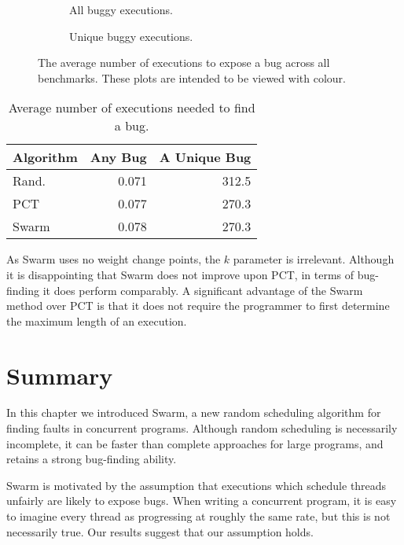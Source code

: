 \begin{figure}
  \centering
  \begin{subfigure}{0.49\textwidth}
    \centering
    \resizebox{\textwidth}{!}{}
    \caption{All buggy executions.}\label{fig:freqbugs-total}
  \end{subfigure}
  \begin{subfigure}{0.49\textwidth}
    \centering
    \resizebox{\textwidth}{!}{}
    \caption{Unique buggy executions.}\label{fig:freqbugs-unique}
  \end{subfigure}
  \caption[Plot of average number of executions needed to expose a bug.]{The average number of executions to expose a bug across all benchmarks.  These plots are intended to be viewed with colour.}\label{fig:freqbugs}
\end{figure}

\begin{table}
  \centering
  \begin{tabular}{lrr} \toprule
    Algorithm & Any Bug & A Unique Bug \\ \midrule
    Rand. & 0.071 & 312.5 \\
    PCT   & 0.077 & 270.3 \\
    Swarm & 0.078 & 270.3 \\ \bottomrule
  \end{tabular}
  \caption{Average number of executions needed to find a bug.}\label{tbl:freqs}
\end{table}

As Swarm uses no weight change points, the $k$ parameter is
irrelevant.  Although it is disappointing that Swarm does not improve
upon PCT, in terms of bug-finding it does perform comparably.  A
significant advantage of the Swarm method over PCT is that it does not
require the programmer to first determine the maximum length of an
execution.

\section{Summary}

In this chapter we introduced Swarm, a new random scheduling algorithm
for finding faults in concurrent programs.  Although random scheduling
is necessarily incomplete, it can be faster than complete approaches
for large programs, and retains a strong bug-finding ability.

Swarm is motivated by the assumption that executions which schedule
threads unfairly are likely to expose bugs.  When writing a concurrent
program, it is easy to imagine every thread as progressing at roughly
the same rate, but this is not necessarily true.  Our results suggest
that our assumption holds.

